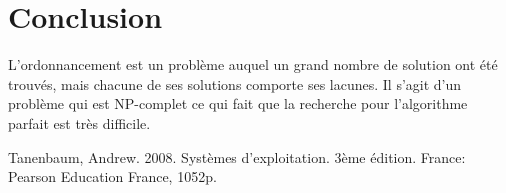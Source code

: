 \documentclass{article}
\begin{document}
\section{Conclusion}

L'ordonnancement est un problème auquel un grand nombre de solution ont été trouvés, mais chacune de ses solutions comporte ses lacunes. Il s'agit d'un problème qui est NP-complet ce qui fait que la recherche pour l'algorithme parfait est très difficile.

\begin{thebibliography}{9}
Tanenbaum, Andrew. 2008. Systèmes d'exploitation. 3ème édition. France: Pearson Education France, 1052p.
\end{thebibliography}
\end{document}
